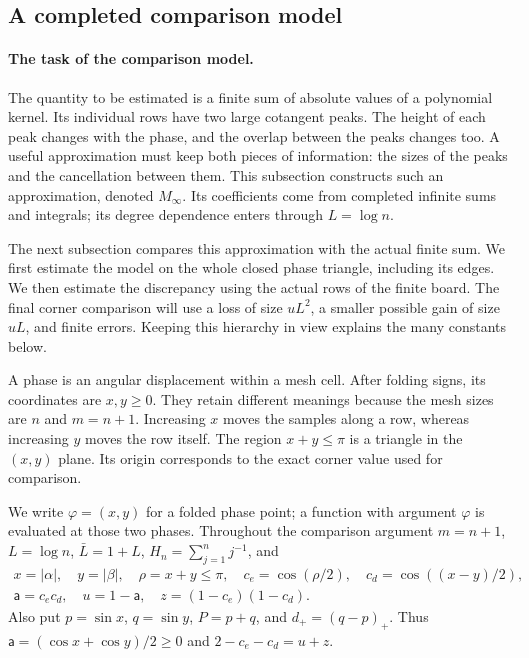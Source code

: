 \subsection{A completed comparison model}
\label{uc:model}

\paragraph{The task of the comparison model.}
The quantity to be estimated is a finite sum of absolute values of a
polynomial kernel. Its individual rows have two large cotangent peaks.
The height of each peak changes with the phase, and the overlap between
the peaks changes too. A useful approximation must keep both pieces of
information: the sizes of the peaks and the cancellation between them.
This subsection constructs such an approximation, denoted $M_\infty$.
Its coefficients come from completed infinite sums and integrals; its
degree dependence enters through $L=\log n$.

The next subsection compares this approximation with the actual finite
sum. We first estimate the model on the whole closed phase triangle,
including its edges. We then estimate the discrepancy using the actual
rows of the finite board. The final corner comparison will use a loss
of size $uL^2$, a smaller possible gain of size $uL$, and finite errors.
Keeping this hierarchy in view explains the many constants below.

A phase is an angular displacement within a mesh cell. After folding
signs, its coordinates are $x,y\geq0$. They retain different meanings
because the mesh sizes are $n$ and $m=n+1$. Increasing $x$ moves the
samples along a row, whereas increasing $y$ moves the row itself. The
region $x+y\leq\pi$ is a triangle in the $(x,y)$ plane. Its origin
corresponds to the exact corner value used for comparison.

We write $\varphi=(x,y)$ for a folded phase point; a function
with argument $\varphi$ is evaluated at those two phases.
Throughout the comparison argument $m=n+1$, $L=\log n$, $\bar{L}=1+L$,
$H_n=\sum_{j=1}^n j^{-1}$, and
\[
 \begin{gathered}
 x=|\alpha|,\quad y=|\beta|,\quad \rho=x+y\leq\pi,\quad
 c_e=\cos(\rho/2),\quad c_d=\cos((x-y)/2),\\
 \mathsf{a}=c_ec_d,\quad u=1-\mathsf{a},\quad z=(1-c_e)(1-c_d).
 \end{gathered}
\]
Also put $p=\sin x$, $q=\sin y$, $P=p+q$, and $d_+=(q-p)_+$.
Thus $\mathsf{a}=(\cos x+\cos y)/2\geq0$ and $2-c_e-c_d=u+z$.

